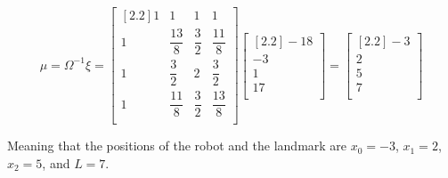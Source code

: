 \begin{equation}
\label{eq:slam_calc}
\mu = \Omega^{-1}\xi = 
\begin{bmatrix}[2.2]
1 & 1 & 1 & 1 \\
1 & \dfrac{13}{8} & \dfrac{3}{2} & \dfrac{11}{8} \\
1 & \dfrac{3}{2} & 2 & \dfrac{3}{2} \\
1 & \dfrac{11}{8} & \dfrac{3}{2} & \dfrac{13}{8} \\
\end{bmatrix}
\begin{bmatrix}[2.2]
-18 \\
-3 \\
1 \\
17 \\
\end{bmatrix} =
\begin{bmatrix}[2.2]
-3 \\
2 \\
5 \\
7 \\
\end{bmatrix}
\end{equation}

Meaning that the positions of the robot and the landmark are $x_0 = -3$, $x_1 = 2$, $x_2 = 5$, and $L = 7$.
